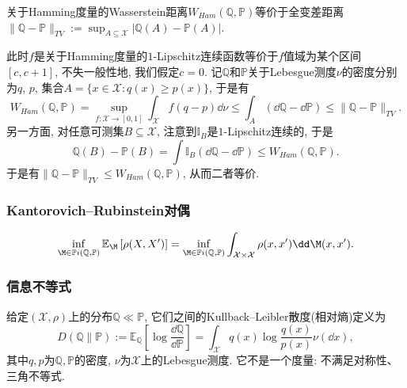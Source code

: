 \begin{example}[Hamming度量和全变差距离]
	关于Hamming度量的Wasserstein距离$W_{Ham}(\mathbb{Q}, \mathbb{P})$等价于全变差距离$\|\mathbb{Q} - \mathbb{P}\|_{TV} := \sup_{A \subseteq \mathcal{X}} |\mathbb{Q}(A) - \mathbb{P}(A)|$. 
	
	此时$f$是关于Hamming度量的$1$-Lipschitz连续函数等价于$f$值域为某个区间$[c, c+1]$, 不失一般性地, 我们假定$c = 0$. 
	记$\mathbb{Q}$和$\mathbb{P}$关于Lebesgue测度$\nu$的密度分别为$q$, $p$, 集合$A = \{x \in \mathcal{X} \colon q(x) \geq p(x)\} $, 于是有
	\begin{equation*}
		W_{Ham}(\mathbb{Q}, \mathbb{P})
		= \sup_{f \colon \mathcal{X} \to [0, 1]} \int_{\mathcal{X}} f (q - p) \dd \nu 
		\leq \int_A (\dd \mathbb{Q} - \dd \mathbb{P})
		\leq \|\mathbb{Q} - \mathbb{P}\|_{TV}. 
	\end{equation*}
	另一方面, 对任意可测集$B \subseteq \mathcal{X}$, 注意到$\mathbb{I}_B$是$1$-Lipschitz连续的, 于是
	\begin{equation*}
		\mathbb{Q}(B) - \mathbb{P}(B) 
		= \int \mathbb{I}_B (\dd \mathbb{Q} - \dd \mathbb{P}) 
		\leq W_{Ham}(\mathbb{Q}, \mathbb{P}). 
	\end{equation*}
	于是有$\|\mathbb{Q} - \mathbb{P}\|_{TV} \leq W_{Ham}(\mathbb{Q}, \mathbb{P})$, 从而二者等价. 
\end{example}

\subsubsection{Kantorovich–Rubinstein对偶}

\begin{equation*}
	\inf_{\M \in \mathbb{P}i(\mathbb{Q}, \mathbb{P})} \mathbb{E}_{\M} \left[ \rho(X, X') \right]
	= \inf_{\M \in \mathbb{P}i(\mathbb{Q}, \mathbb{P})} \int_{\mathcal{X} \times \mathcal{X}} \rho(x, x') \dd \M(x, x'). 
\end{equation*}

\subsubsection{信息不等式}

给定$(\mathcal{X}, \rho)$上的分布$\mathbb{Q} \ll \mathbb{P}$, 它们之间的Kullback–Leibler散度(相对熵)定义为
\begin{equation}
	D(\mathbb{Q} \| \mathbb{P})
	:= \mathbb{E}_{\mathbb{Q}} \left[ \log \frac{\dd \mathbb{Q}}{\dd \mathbb{P}} \right]
	= \int_{\mathcal{X}} q(x) \log \frac{q(x)}{p(x)} \nu(\dd x), 
\end{equation}
其中$q, p$为$\mathbb{Q}, \mathbb{P}$的密度, $\nu$为$\mathcal{X}$上的Lebesgue测度. 
它不是一个度量: 不满足对称性、三角不等式. 
 
